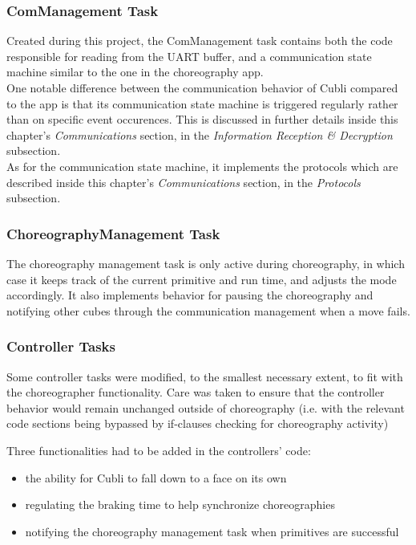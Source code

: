 \subsubsection{ComManagement Task}

Created during this project, the ComManagement task contains both the code responsible for reading from the UART buffer, and a communication state machine similar to the one in the choreography app.\\

One notable difference between the communication behavior of Cubli compared to the app is that its communication state machine is triggered regularly rather than on specific event occurences. This is discussed in further details inside this chapter's \textit{Communications} section, in the \textit{Information Reception \& Decryption} subsection.\\ 

As for the communication state machine, it implements the protocols which are described inside this chapter's \textit{Communications} section, in the \textit{Protocols} subsection. 

\subsubsection{ChoreographyManagement Task}

The choreography management task is only active during choreography, in which case it keeps track of the current primitive and run time, and adjusts the mode accordingly. It also implements behavior for pausing the choreography and notifying other cubes through the communication management when a move fails.



\subsubsection{Controller Tasks}

Some controller tasks were modified, to the smallest necessary extent, to fit with the choreographer functionality. Care was taken to ensure that the controller behavior would remain unchanged outside of choreography (i.e. with the relevant code sections being bypassed by if-clauses checking for choreography activity)

Three functionalities had to be added in the controllers' code:
\begin{itemize}
\item the ability for Cubli to fall down to a face on its own
\item regulating the braking time to help synchronize choreographies
\item notifying the choreography management task when primitives are successful
\end{itemize}


